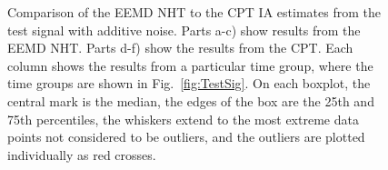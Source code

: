 \documentclass[a4paper]{IEEEtran}
\begin{document}
\begin{figure}[ht]
		\caption{Comparison of the EEMD NHT to the CPT IA estimates from the test signal with additive noise. Parts a-c) show results from the EEMD NHT. Parts d-f) show the results from the CPT. Each column shows the results from a particular time group, where the time groups are shown in Fig.~\ref{fig:TestSig}. On each boxplot, the central mark is the median, the edges of the box are the 25th and 75th percentiles, the whiskers extend to the most extreme data points not considered to be outliers, and the outliers are plotted individually as red crosses.}
		\label{fig:RMSEComparisonSig1_IA}
\end{figure}
\end{document}
